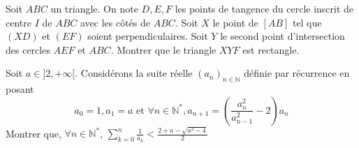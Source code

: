\begin{exo}{}
Soit $ABC$ un triangle. On note $D,E,F$ les points de tangence du cercle inscrit de centre $I$ de $ABC$ avec les côtés de $ABC$. Soit $X$ le point de $[AB]$ tel que $(XD)$ et $(EF)$ soient perpendiculaires. Soit $Y$ le second point d'intersection des cercles $AEF$ et $ABC$. Montrer que le triangle $XYF$ est rectangle.
\end{exo}



\begin{exo}{}
Soit $a \in ]2, +\infty[$. Considérons la suite réelle $(a_n)_{n \in\mathbb{N}}$ définie par récurrence en posant
\[ a_0 = 1, a_1 = a \text{ et } \forall n \in 	\mathbb{N^{*}}, a_{n+1} = \left( \frac{a_n^2}{a_{n-1}^2} - 2 \right)a_n\]
Montrer que, $\forall n \in \mathbb{N^{*}}$, $\displaystyle \sum_{k=0}^{n} \frac{1}{a_k} < \frac{2+a-\sqrt{a^2-4}}{2}$
\end{exo}

